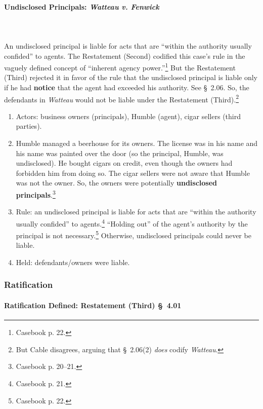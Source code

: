 \paragraph{Undisclosed Principals: \emph{Watteau v. Fenwick}}
\label{par:watteau}
~\\\\
An undisclosed principal is liable for acts that are ``within the authority 
usually confided'' to agents.  The Restatement (Second) codified this case's 
rule in the vaguely defined concept of ``inherent agency 
power.''\footnote{Casebook p. 22.} But the Restatement (Third) rejected it in 
favor of the rule that the undisclosed principal is liable only if he had 
\textbf{notice} that the agent had exceeded his authority. See \S\ 2.06. So, 
the defendants in \emph{Watteau} would not be liable under the Restatement 
(Third).\footnote{But Cable disagrees, arguing that \S\ 2.06(2) \emph{does} 
codify \emph{Watteau}.}

\begin{enumerate}
    \item Actors: business owners (principals), Humble (agent), cigar sellers 
    (third parties).
    \item Humble managed a beerhouse for its owners. The license was in his 
    name and his name was painted over the door (so the principal, Humble, was 
    undisclosed). He bought cigars on credit, even though the owners had 
    forbidden him from doing so. The cigar sellers were not aware that Humble 
    was not the owner. So, the owners were potentially \textbf{undisclosed 
    principals}.\footnote{Casebook p. 20--21.}
    \item Rule: an undisclosed principal is liable for acts that are ``within 
    the authority usually confided'' to agents.\footnote{Casebook p. 21.} 
    ``Holding out'' of the agent's authority by the principal is not 
    necessary.\footnote{Casebook p. 22.} Otherwise, undisclosed principals 
    could never be liable.
    \item Held: defendants/owners were liable.
\end{enumerate}

\subsubsection{Ratification}

\paragraph{Ratification Defined: Restatement (Third) \S\ 4.01}

